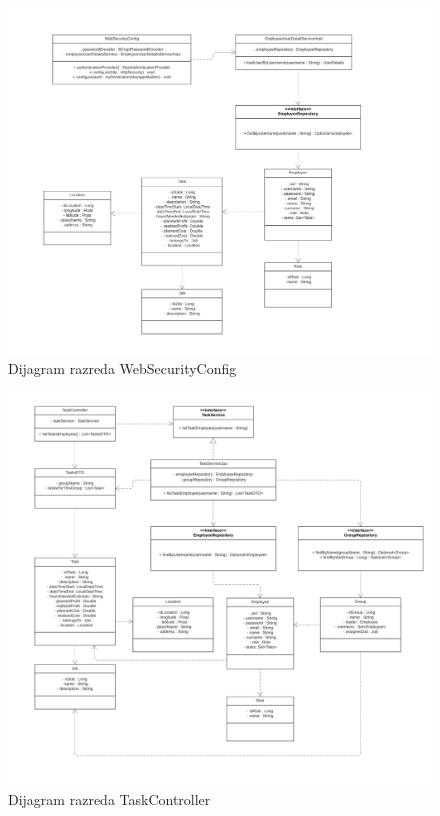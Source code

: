 			
			\eject
			\begin{figure}[H]
					\centering
					\includegraphics[width=\textwidth]{slike/Dijagram razreda - WebSecurityConfig.jpeg}
					\caption{Dijagram razreda WebSecurityConfig}
				\end{figure}
			
			
			\eject
			\begin{figure}[H]
					\centering
					\includegraphics[width=\textwidth]{slike/Dijagram razreda - TaskController.jpg}
					\caption{Dijagram razreda TaskController}
				\end{figure}
			
